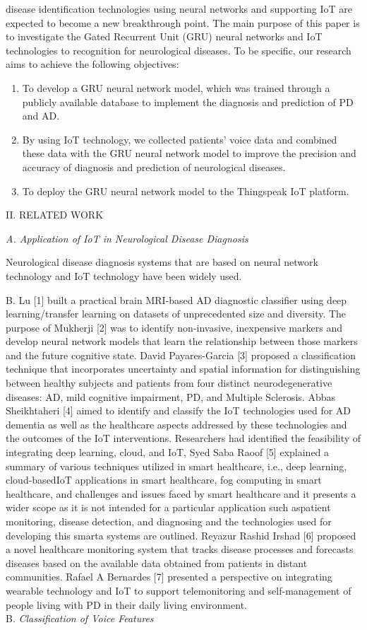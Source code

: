 \documentclass{article}
\begin{document}
\begin{multicols*}{2}
disease identification technologies using neural networks
and supporting IoT are expected to become a new
breakthrough point.
The main purpose of this paper is to investigate the
Gated Recurrent Unit (GRU) neural networks and IoT
technologies to recognition for neurological diseases. To
be specific, our research aims to achieve the following
objectives:
\begin{enumerate}
\item To develop a GRU neural network model, which
was trained through a publicly available database
to implement the diagnosis and prediction of PD
and AD.
\item By using IoT technology, we collected patients’
voice data and combined these data with the GRU
neural network model to improve the precision and
accuracy of diagnosis and prediction of neurological diseases.
\item To deploy the GRU neural network model to the
Thingspeak IoT platform.
\end{enumerate}
\begin{center}
II. RELATED WORK
\end{center}
\textit{A. Application of IoT in Neurological Disease Diagnosis}

Neurological disease diagnosis systems that are based
on neural network technology and IoT technology have
been widely used.

B. Lu [1] built a practical brain MRI-based AD diagnostic classifier using deep learning/transfer learning on
datasets of unprecedented size and diversity. The purpose
of Mukherji [2] was to identify non-invasive, inexpensive
markers and develop neural network models that learn
the relationship between those markers and the future
cognitive state. David Payares-Garcia [3] proposed a
classification technique that incorporates uncertainty and
spatial information for distinguishing between healthy
subjects and patients from four distinct neurodegenerative diseases: AD, mild cognitive impairment, PD,
and Multiple Sclerosis. Abbas Sheikhtaheri [4] aimed
to identify and classify the IoT technologies used for
AD dementia as well as the healthcare aspects addressed
by these technologies and the outcomes of the IoT
interventions.
\newpage
Researchers had identified the feasibility of integrating deep learning, cloud, and IoT, Syed Saba Raoof
[5] explained a summary of various techniques utilized
in smart healthcare, i.e., deep learning, cloud-basedIoT applications in smart healthcare, fog computing in
smart healthcare, and challenges and issues faced by
smart healthcare and it presents a wider scope as it is
not intended for a particular application such aspatient
monitoring, disease detection, and diagnosing and the
technologies used for developing this smarta systems are
outlined. Reyazur Rashid Irshad [6] proposed a novel
healthcare monitoring system that tracks disease processes and forecasts diseases based on the available data
obtained from patients in distant communities. Rafael
A Bernardes [7] presented a perspective on integrating
wearable technology and IoT to support telemonitoring
and self-management of people living with PD in their
daily living environment.\\
B.\textit{ Classification of Voice Features}


\end{multicols*}
\end{document}
